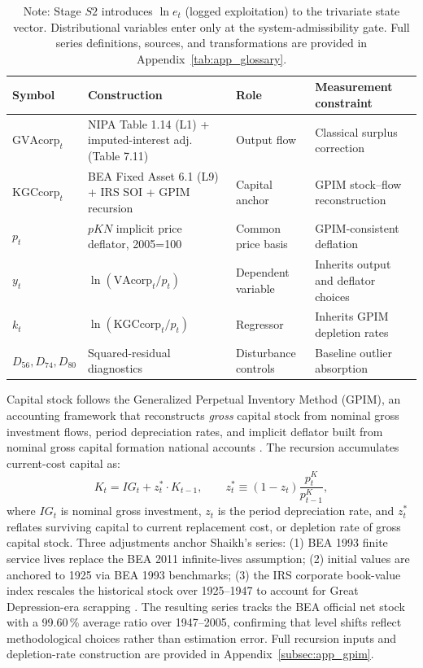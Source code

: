 \documentclass[11pt]{article}
\begin{document}
\begin{table}[h!]
\centering
\caption{Core replication variables: symbols, sources, and transformations}
\label{tab:variables_replication}
\small
\begin{tabular}{@{}>{\raggedright\arraybackslash}p{2.8cm}>{\raggedright\arraybackslash}p{4.5cm}>{\raggedright\arraybackslash}p{2.2cm}>{\raggedright\arraybackslash}p{3.2cm}@{}}
\toprule
Symbol & Construction & Role & Measurement constraint \\
\midrule
$\text{GVAcorp}_t$ & NIPA Table 1.14 (L1) + imputed-interest adj. (Table 7.11) & Output flow & Classical surplus correction \\
$\text{KGCcorp}_t$ & BEA Fixed Asset 6.1 (L9) + IRS SOI + GPIM recursion & Capital anchor & GPIM stock--flow reconstruction \\
$p_t$ & $pKN$ implicit price deflator, 2005=100 & Common price basis & GPIM-consistent deflation \\
$y_t$ & $\ln(\text{VAcorp}_t/p_t)$ & Dependent variable & Inherits output and deflator choices \\
$k_t$ & $\ln(\text{KGCcorp}_t/p_t)$ & Regressor & Inherits GPIM depletion rates \\
$D_{56},D_{74},D_{80}$ & Squared-residual diagnostics  & Disturbance controls & Baseline outlier absorption \\
\bottomrule
\end{tabular}
\caption*{Note: Stage $S2$ introduces $\ln e_t$ (logged exploitation) to the trivariate state vector. Distributional variables enter only at the system-admissibility gate. Full series definitions, sources, and transformations are provided in Appendix~\ref{tab:app_glossary}.}
\end{table}

Capital stock follows the Generalized Perpetual Inventory Method (GPIM), an accounting framework that reconstructs \textit{gross} capital stock from nominal gross investment flows, period depreciation rates, and implicit deflator built from nominal gross capital formation national accounts  \citep{Shaikh2016}. The recursion accumulates current-cost capital as:
\begin{equation}
K_t = IG_t + z_t^* \cdot K_{t-1},
\qquad
z_t^* \equiv (1 - z_t) \frac{p^K_t}{p^K_{t-1}},
\end{equation}
where $IG_t$ is nominal gross investment, $z_t$ is the period depreciation rate, and $z_t^*$ reflates surviving capital to current replacement cost, or depletion rate of gross capital stock. Three adjustments anchor Shaikh's series: (1) BEA 1993 finite service lives replace the BEA 2011 infinite-lives assumption; (2) initial values are anchored to 1925 via BEA 1993 benchmarks; (3) the IRS corporate book-value index rescales the historical stock over 1925--1947 to account for Great Depression-era scrapping \citep[Appendix~6.7, Sec.~V]{Shaikh2016}. The resulting series tracks the BEA official net stock with a 99.60\,\% average ratio over 1947--2005, confirming that level shifts reflect methodological choices rather than estimation error. Full recursion inputs and depletion-rate construction are provided in Appendix~\ref{subsec:app_gpim}.
\end{document}
